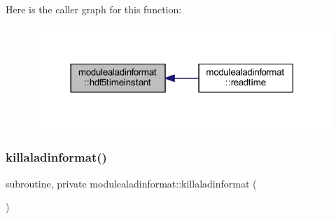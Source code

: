 Here is the caller graph for this function\+:\nopagebreak
\begin{figure}[H]
\begin{center}
\leavevmode
\includegraphics[width=318pt]{namespacemodulealadinformat_a5841418d49ae6a17486590f8f686e489_icgraph}
\end{center}
\end{figure}
\mbox{\label{namespacemodulealadinformat_a5391156d679edf14a9f2631410182102}} 
\subsubsection{\texorpdfstring{killaladinformat()}{killaladinformat()}}
{\footnotesize\ttfamily subroutine, private modulealadinformat\+::killaladinformat (\begin{DoxyParamCaption}{ }\end{DoxyParamCaption})\hspace{0.3cm}{\ttfamily [private]}}

